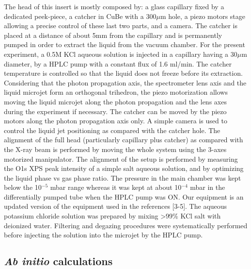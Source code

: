 The head of this insert is mostly composed by: a glass capillary fixed by a dedicated peek-piece, a catcher in CuBe with a 300$\mu$m hole, a piezo motors stage allowing a precise control of these last two parts, and a camera. The catcher is placed at a distance of about 5mm from the capillary and is permanently pumped in order to extract the liquid from the vacuum chamber. For the present experiment, a 0.5M KCl aqueous solution is injected in a capillary having a 30$\mu$m diameter, by a HPLC pump with a constant flux of 1.6 ml/min. The catcher temperature is controlled so that the liquid does not freeze before its extraction. Considering that the photon propagation axis, the spectrometer lens axis and the liquid microjet form an orthogonal trihedron, the piezo motorization allows moving the liquid microjet along the photon propagation and the lens axes during the experiment if necessary. The catcher can be moved by the piezo motors along the photon propagation axis only. A simple camera is used to control the liquid jet positioning as compared with the catcher hole. The alignment of the full head (particularly capillary plus catcher) as compared with the X-ray beam is performed by moving the whole system using the 3-axes motorized manipulator. The alignment of the setup is performed by measuring the O1s XPS peak intensity of a simple salt aqueous solution, and by optimizing the liquid phase vs gas phase ratio. The pressure in the main chamber was kept below the 10$^{-5}$ mbar range whereas it was kept at about 10$^{-4}$ mbar in the differentially pumped tube when the HPLC pump was ON. Our equipment is an updated version of the equipment used in the references [3-5]. The aqueous potassium chloride solution was prepared by mixing >99\% KCl salt with deionized water. Filtering and degazing procedures were systematically performed before injecting the solution into the microjet by the HPLC pump.


\subsection{{\bf{\it Ab initio}} calculations}

